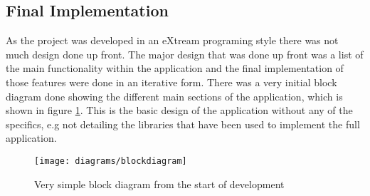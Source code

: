 \subsection{Final Implementation}

As the project was developed in an eXtream programing style there was not much design done up front. The major design that was done up front was a list of the main functionality within the application and the final implementation of those features were done in an iterative form. There was a very initial block diagram done showing the different main sections of the application, which is shown in figure \ref{fig:initial_diagram_image}. This is the basic design of the application without any of the specifics, e.g not detailing the libraries that have been used to implement the full application.\\

\begin{figure}[H]
    \centering
    \texttt{[image: diagrams/blockdiagram]}
    \caption{Very simple block diagram from the start of development}
    \label{fig:initial_diagram_image}
\end{figure} 

